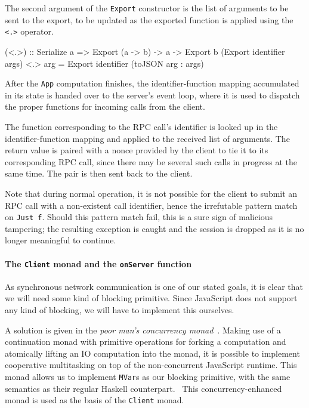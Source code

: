 \documentclass[preprint]{sigplanconf}
\begin{document}
The second argument of the \lstinline!Export! constructor is the list of
arguments to be sent to the export, to be updated as the exported function is
applied using the \lstinline!<.>! operator.

\begin{code}
(<.>) :: Serialize a
      => Export (a -> b) -> a -> Export b
(Export identifier args) <.> arg =
  Export identifier (toJSON arg : args)
\end{code}

After the \lstinline!App! computation finishes, the identifier-function mapping
accumulated in its state is handed over to the server's event loop, where it is
used to dispatch the proper functions for incoming calls from the client.


The function corresponding to the RPC call's identifier is looked up in the
identifier-function mapping and applied to the received list of arguments.
The return value is paired with a nonce provided by the client to tie it to
its corresponding RPC call, since there may be several such calls in progress
at the same time. The pair is then sent back to the client.

Note that during normal operation, it is not possible for the client to submit
an RPC call with a non-existent call identifier, hence the irrefutable pattern
match on \lstinline!Just f!. Should this pattern match fail, this is a sure
sign of malicious tampering; the resulting exception is caught and the session
is dropped as it is no longer meaningful to continue.

\paragraph{The \lstinline!Client! monad and the \lstinline!onServer! function}
As synchronous network communication is one of our stated goals, it is clear
that we will need some kind of blocking primitive. Since JavaScript does not
support any kind of blocking, we will have to implement this ourselves.

A solution is given in the \emph{poor man's concurrency
monad}\ \cite{concurrencymonad}. Making use of a continuation monad with
primitive operations for forking a computation and atomically lifting an IO
computation into the monad, it is possible to implement cooperative
multitasking on top of the non-concurrent JavaScript runtime. This monad
allows us to implement \lstinline!MVar!s as our blocking primitive, with the
same semantics as their regular Haskell counterpart.\ \cite{ffi}
This concurrency-enhanced monad is used as the basis of the \lstinline!Client!
monad.
\end{document}
